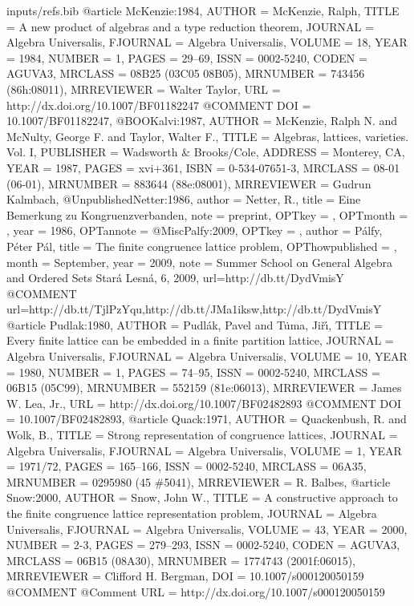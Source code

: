 \begin{filecontents*}{inputs/refs.bib}
  @article {McKenzie:1984,
    AUTHOR = {McKenzie, Ralph},
    TITLE = {A new product of algebras and a type reduction theorem},
    JOURNAL = {Algebra Universalis},
    FJOURNAL = {Algebra Universalis},
    VOLUME = {18},
    YEAR = {1984},
    NUMBER = {1},
    PAGES = {29--69},
    ISSN = {0002-5240},
    CODEN = {AGUVA3},
    MRCLASS = {08B25 (03C05 08B05)},
    MRNUMBER = {743456 (86h:08011)},
    MRREVIEWER = {Walter Taylor},
    URL = {http://dx.doi.org/10.1007/BF01182247}
  }
  @COMMENT       DOI = {10.1007/BF01182247},
  @BOOK{alvi:1987,
    AUTHOR = {McKenzie, Ralph N. and McNulty, George F. and Taylor, Walter F.},
    TITLE = {Algebras, lattices, varieties. {V}ol. {I}},
    PUBLISHER = {Wadsworth \& Brooks/Cole},
    ADDRESS = {Monterey, CA},
    YEAR = {1987},
    PAGES = {xvi+361},
    ISBN = {0-534-07651-3},
    MRCLASS = {08-01 (06-01)},
    MRNUMBER = {883644 (88e:08001)},
    MRREVIEWER = {Gudrun Kalmbach},
  }
  @Unpublished{Netter:1986,
    author = 	 {Netter, R.},
    title = 	 {Eine Bemerkung zu Kongruenzverbanden},
    note = 	 {preprint},
    OPTkey = 	 {},
    OPTmonth = 	 {},
    year = 	 {1986},
    OPTannote = 	 {}
  }
  @Misc{Palfy:2009,
    OPTkey = 	 {},
    author = 	 {P{\'a}lfy, P{\'e}ter P{\'a}l},
    title = 	 {The finite congruence lattice problem},
    OPThowpublished = {},
    month = 	 {September},
    year = 	 {2009},
    note = 	 {Summer School on General Algebra and Ordered Sets Star{\'a} Lesn{\'a},  6, 2009},
    url={http://db.tt/DydVmisY}
  }
  @COMMENT url={http://db.tt/TjlPzYqu,http://db.tt/JMa1iksw,http://db.tt/DydVmisY}
  @article {Pudlak:1980,
    AUTHOR = {Pudl{\'a}k, Pavel and T{\.u}ma, Ji{\v{r}}{\'{\i}}},
    TITLE = {Every finite lattice can be embedded in a finite partition
      lattice},
    JOURNAL = {Algebra Universalis},
    FJOURNAL = {Algebra Universalis},
    VOLUME = {10},
    YEAR = {1980},
    NUMBER = {1},
    PAGES = {74--95},
    ISSN = {0002-5240},
    MRCLASS = {06B15 (05C99)},
    MRNUMBER = {552159 (81e:06013)},
    MRREVIEWER = {James W. Lea, Jr.},
    URL = {http://dx.doi.org/10.1007/BF02482893}
  }
  @COMMENT       DOI = {10.1007/BF02482893},
  @article {Quack:1971,
    AUTHOR = {Quackenbush, R. and Wolk, B.},
    TITLE = {Strong representation of congruence lattices},
    JOURNAL = {Algebra Universalis},
    FJOURNAL = {Algebra Universalis},
    VOLUME = {1},
    YEAR = {1971/72},
    PAGES = {165--166},
    ISSN = {0002-5240},
    MRCLASS = {06A35},
    MRNUMBER = {0295980 (45 \#5041)},
    MRREVIEWER = {R. Balbes},
  }
  @article {Snow:2000,
    AUTHOR = {Snow, John W.},
    TITLE = {A constructive approach to the finite congruence lattice
      representation problem},
    JOURNAL = {Algebra Universalis},
    FJOURNAL = {Algebra Universalis},
    VOLUME = {43},
    YEAR = {2000},
    NUMBER = {2-3},
    PAGES = {279--293},
    ISSN = {0002-5240},
    CODEN = {AGUVA3},
    MRCLASS = {06B15 (08A30)},
    MRNUMBER = {1774743 (2001f:06015)},
    MRREVIEWER = {Clifford H. Bergman},
    DOI = {10.1007/s000120050159}
  }
  @COMMENT       
  @Comment URL = {http://dx.doi.org/10.1007/s000120050159}


\end{filecontents*}
